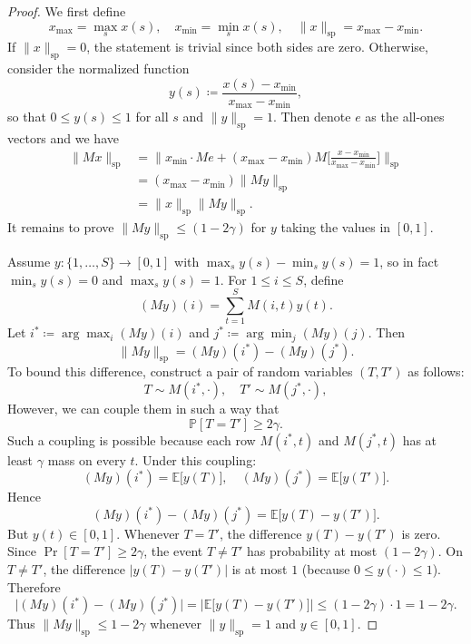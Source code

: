 \begin{proof}
We first define 
\[
x_{\max} = \max_{s} x(s),
\quad
x_{\min} = \min_{s} x(s),
\quad
\|x\|_{\mathrm{sp}} = x_{\max} - x_{\min}.
\]
If $\|x\|_{\mathrm{sp}} = 0$, the statement is trivial since both sides are zero. Otherwise, consider the normalized function
\[
y(s) \coloneqq \frac{x(s) - x_{\min}}{\,x_{\max}-x_{\min}\,},
\]
so that $0 \le y(s) \le 1$ for all $s$ and $\|y\|_{\mathrm{sp}} = 1$. 
Then denote $e$ as the all-ones vectors and we have
\begin{align}
\|M x\|_{\mathrm{sp}} &= \| x_{\min} \cdot Me + (x_{\max}-x_{\min})M\bigl[\tfrac{x - x_{\min}}{x_{\max}-x_{\min}}\bigr] \|_{\mathrm{sp}} \\ \nonumber
&=(x_{\max}-x_{\min})\bigl\| My \bigr\|_{\mathrm{sp}}\\ \nonumber
&=\|x\|_{\mathrm{sp}}\|M y\|_{\mathrm{sp}}.
\end{align}
It remains to prove $\|M y\|_{\mathrm{sp}} \le (1-2\gamma)$ for $y$ taking the values in $[0,1]$.

Assume $y:\{1,\dots,S\}\to[0,1]$ with $\max_s y(s) - \min_s y(s)=1$, so in fact $\min_s y(s)=0$ and $\max_s y(s)=1$. For $1\le i \le S$, define
\begin{equation}
(M y)(i) =\sum_{t=1}^S M(i,t)y(t).
\end{equation}
Let $i^* \coloneqq \arg\max_i (M y)(i)$ and $j^* \coloneqq \arg\min_j (M y)(j)$. 
Then
\begin{equation}
\|M y\|_{\mathrm{sp}}=(M y)(i^*) - (M y)(j^*).
\end{equation}
To bound this difference, construct a pair of random variables $(T,T')$ as follows:
\begin{equation}
T \sim M(i^*,\cdot), \quad T' \sim M(j^*,\cdot),
\end{equation}
However, we can couple them in such a way that 
$$
\mathbb{P}[T = T'] \geq 2\gamma.
$$
Such a coupling is possible because each row $M(i^*,t)$ and $M(j^*,t)$ 
has at least $\gamma$ mass on every $t$. Under this coupling:
\[
(M y)(i^*) = \mathbb{E}\bigl[y(T)\bigr],
\quad
(M y)(j^*)=\mathbb{E}\bigl[y(T')\bigr].
\]
Hence
\begin{equation}
(M y)(i^*) - (M y)(j^*)=\mathbb{E}\bigl[y(T) - y(T')\bigr].
\end{equation}
But $y(t)\in [0,1]$.  
Whenever $T = T'$, the difference $y(T) - y(T')$ is zero.  
Since $\Pr[T = T'] \ge 2\gamma$, the event $T \neq T'$ has probability at most $(1-2\gamma)$.  
On $T \neq T'$, the difference $|y(T) - y(T')|$ is at most $1$ (because $0 \le y(\cdot)\le 1$).  
Therefore
\begin{equation}
\bigl|(M y)(i^*) - (M y)(j^*)\bigr|=\bigl|\mathbb{E}\bigl[y(T) - y(T')\bigr]\bigr|\leq(1 - 2\gamma)\cdot 1=1 - 2\gamma.
\end{equation}
Thus $\|M y\|_{\mathrm{sp}} \le 1 - 2\gamma$ whenever $\|y\|_{\mathrm{sp}}=1$ and $y\in[0,1]$.
\end{proof}

